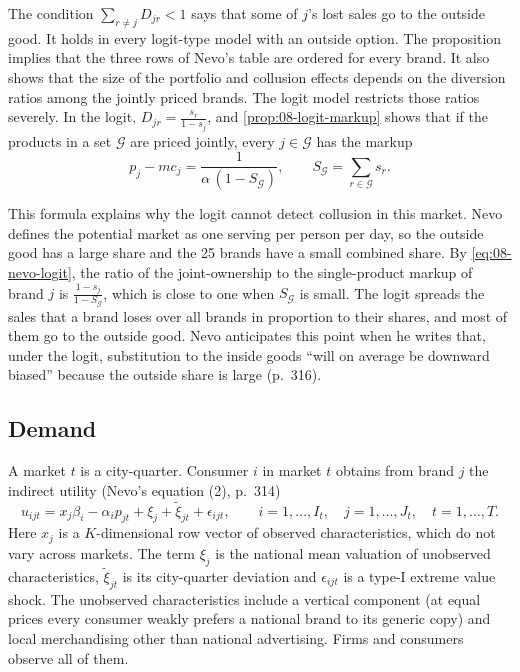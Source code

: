 The condition $\sum_{r\neq j} D_{jr} < 1$ says that some of $j$'s lost sales go to the outside good. It holds in
every logit-type model with an outside option. The proposition implies that the three rows of Nevo's table are
ordered for every brand. It also shows that the size of the portfolio and collusion effects depends on the
diversion ratios among the jointly priced brands. The logit model restricts those ratios severely. In the logit,
$D_{jr} = \frac{s_r}{1-s_j}$, and \cref{prop:08-logit-markup} shows that if the products in a set $\mathcal{G}$ are
priced jointly, every $j \in \mathcal{G}$ has the markup
\begin{equation}\label{eq:08-nevo-logit}
p_j - mc_j = \frac{1}{\alpha\,(1 - S_{\mathcal{G}})}, \qquad S_{\mathcal{G}} = \sum_{r \in \mathcal{G}} s_r .
\end{equation}

This formula explains why the logit cannot detect collusion in this market. Nevo defines the potential market
as one serving per person per day, so the outside good has a large share and the 25 brands have a small
combined share. By \eqref{eq:08-nevo-logit}, the ratio of the joint-ownership to the single-product markup of brand $j$ is
$\frac{1-s_j}{1-S_{\mathcal{G}}}$, which is close to one when $S_{\mathcal{G}}$ is small. The logit spreads the
sales that a brand loses over all brands in proportion to their shares, and most of them go to the outside
good. Nevo anticipates this point when he writes that, under the logit, substitution to the inside goods ``will
on average be downward biased'' because the outside share is large (p.~316).

\subsection{Demand}\label{sec:08-nevo01-demand}

A market $t$ is a city-quarter. Consumer $i$ in market $t$ obtains from brand $j$ the indirect utility (Nevo's
equation (2), p.~314)
\begin{equation}\label{eq:08-nevo01-utility}
u_{ijt} = x_j \beta_i - \alpha_i p_{jt} + \xi_j + \tilde\xi_{jt} + \epsilon_{ijt},
\qquad i = 1,\dots,I_t,\quad j = 1,\dots,J_t,\quad t = 1,\dots,T .
\end{equation}
Here $x_j$ is a $K$-dimensional row vector of observed characteristics, which do not vary across markets.
The term $\xi_j$ is the national mean valuation of unobserved characteristics, $\tilde\xi_{jt}$ is its city-quarter
deviation and $\epsilon_{ijt}$ is a type-I extreme value shock. The unobserved characteristics include a
vertical component (at equal prices every consumer weakly prefers a national brand to its generic copy) and
local merchandising other than national advertising. Firms and consumers observe all of them.

